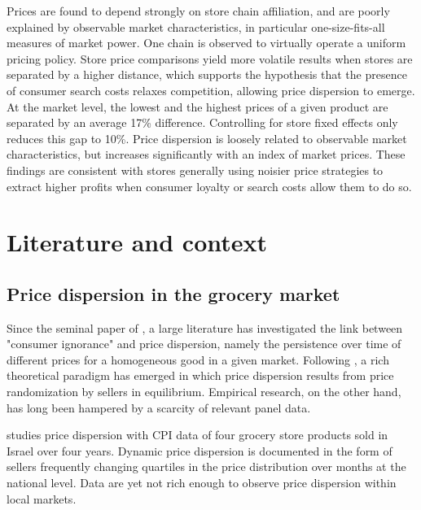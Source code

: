 \documentclass[english]{article}
\begin{document}
Prices are found to depend strongly on store chain affiliation, and are poorly explained by observable market characteristics, in particular one-size-fits-all measures of market power. One chain is observed to virtually operate a uniform pricing policy. Store price comparisons yield more volatile results when stores are separated by a higher distance, which supports the hypothesis that the presence of consumer search costs relaxes competition, allowing price dispersion to emerge. At the market level, the lowest and the highest prices of a given product are separated by an average 17\% difference. Controlling for store fixed effects only reduces this gap to 10\%. Price dispersion is loosely related to observable market characteristics, but increases significantly with an index of market prices. These findings are consistent with stores generally using noisier price strategies to extract higher profits when consumer loyalty or search costs allow them to do so.

\section{Literature and context}


\subsection{Price dispersion in the grocery market}

Since the seminal paper of \cite{STI61}, a large literature has investigated the link between "consumer ignorance" and price dispersion, namely the persistence over time of different prices for a homogeneous good in a given market. Following \cite{VAR80}, a rich theoretical paradigm has emerged in which price dispersion results from price randomization by sellers in equilibrium. Empirical research, on the other hand, has long been hampered by a scarcity of relevant panel data.

\cite{LAC02} studies price dispersion with CPI data of four grocery store products sold in Israel over four years. Dynamic price dispersion is documented in the form of sellers frequently changing quartiles in the price distribution over months at the national level. Data are yet not rich enough to observe price dispersion within local markets.
\end{document}
